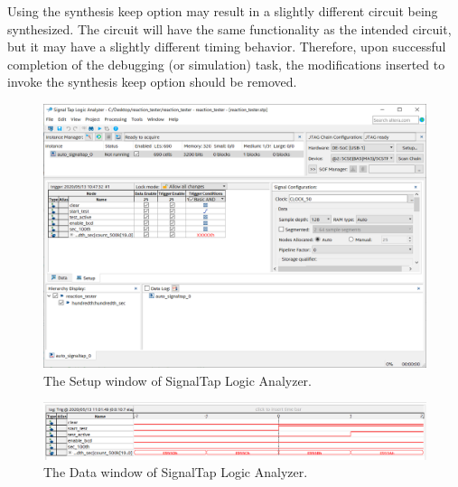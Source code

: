 \documentclass[11pt, twoside, pdftex]{article}
\begin{document}
\noindent
Using the synthesis keep option may result in a slightly different circuit
being synthesized. The circuit will have the same functionality as the intended
circuit, but it may have a slightly different timing behavior. Therefore, upon
successful completion of the debugging (or simulation) task, the modifications
inserted to invoke the synthesis keep option should be removed. 

\begin{figure}[H]
   \begin{center}
      \includegraphics[scale=0.55]{figures/figure18.png}
   \caption{The Setup window of SignalTap Logic Analyzer.} 
	 \label{fig:18}
	 \end{center}
\end{figure}

\begin{figure}[H]
   \begin{center}
      \includegraphics[scale=0.55]{figures/figure19.png}
   \caption{The Data window of SignalTap Logic Analyzer.} 
	 \label{fig:19}
	 \end{center}
\end{figure}
\end{document}
